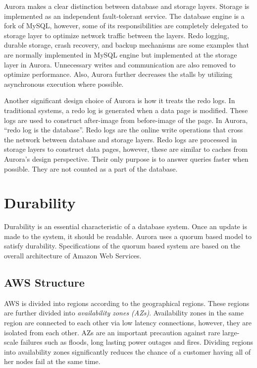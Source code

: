 \documentclass[conference]{IEEEtran}
\begin{document}
Aurora makes a clear distinction between database and storage layers. Storage is implemented as an independent fault-tolerant service. The database engine is a fork of MySQL, however, some of its responsibilities are completely delegated to storage layer to optimize network traffic between the layers. Redo logging, durable storage, crash recovery, and backup mechanisms are some examples that are normally implemented in MySQL engine but implemented at the storage layer in Aurora. Unnecessary writes and communication are also removed to optimize performance. Also, Aurora further decreases the stalls by utilizing asynchronous execution where possible.

Another significant design choice of Aurora is how it treats the redo logs. In traditional systems, a redo log is generated when a data page is modified. These logs are used to construct after-image from before-image of the page. In Aurora, ``redo log is the database''. Redo logs are the online write operations that cross the network between database and storage layers. Redo logs are processed in storage layers to construct data pages, however, these are similar to caches from Aurora's design perspective. Their only purpose is to answer queries faster when possible. They are not counted as a part of the database.


\section{Durability}
Durability is an essential characteristic of a database system. Once an update is made to the system, it should be readable. Aurora uses a quorum based model to satisfy durability. Specifications of the quorum based system are based on the overall architecture of Amazon Web Services.

\subsection{AWS Structure}
AWS is divided into regions according to the geographical regions. These regions are further divided into \textit{availability zones (AZs)}. Availability zones in the same region are connected to each other via low latency connections, however, they are isolated from each other. AZs are an important precaution against rare large-scale failures such as floods, long lasting power outages and fires. Dividing regions into availability zones significantly reduces the chance of a customer having all of her nodes fail at the same time.
\end{document}
